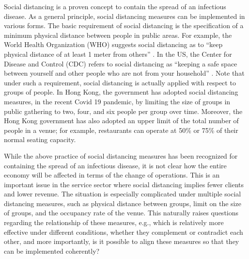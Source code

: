 Social distancing is a proven concept to contain the spread of an infectious disease. As a general principle, social distancing measures can be implemented in various forms. The basic requirement of social distancing is the specification of a minimum physical distance between people in public areas. For example, the World Health Organization (WHO) suggests social distancing as to ``keep physical distance of at least 1 meter from others'' \cite{AdviceforPublic}. In the US, the Center for Disease and Control (CDC) refers to social distancing as ``keeping a safe space between yourself and other people who are not from your household'' \cite{CDC}. 
Note that under such a requirement, social distancing is actually applied with respect to groups of people. In Hong Kong, the government has adopted social distancing measures, in the recent Covid 19 pandemic, by limiting the size of groups in public gathering to two, four, and six people per group over time. Moreover, the Hong Kong government has also adopted an upper limit of the total number of people in a venue; for example, restaurants can operate at 50\% or 75\% of their normal seating capacity.

While the above practice of social distancing measures has been recognized for containing the spread of an infectious disease,  it is not clear how the entire economy will be affected in terms of the change of operations. This is an important issue in the service sector where social distancing implies fewer clients and lower revenue. The situation is especially complicated under multiple social distancing measures, such as physical distance between groups, limit on the size of groups, and the occupancy rate of the venue. This naturally raises questions regarding the relationship of these measures, e.g., which is relatively more effective under different conditions, whether they complement or contradict each other, and more importantly, is it possible to align these measures so that they can be implemented coherently? 



